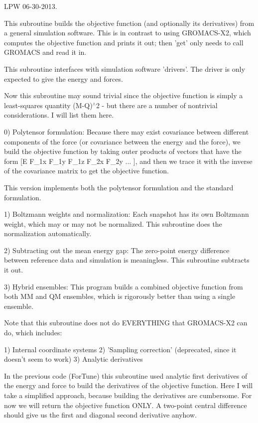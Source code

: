 L\-P\-W 06-\/30-\/2013. 

This subroutine builds the objective function (and optionally its derivatives) from a general simulation software. This is in contrast to using G\-R\-O\-M\-A\-C\-S-\/\-X2, which computes the objective function and prints it out; then 'get' only needs to call G\-R\-O\-M\-A\-C\-S and read it in.

This subroutine interfaces with simulation software 'drivers'. The driver is only expected to give the energy and forces.

Now this subroutine may sound trivial since the objective function is simply a least-\/squares quantity (M-\/\-Q)$^\wedge$2 -\/ but there are a number of nontrivial considerations. I will list them here.

0) Polytensor formulation\-: Because there may exist covariance between different components of the force (or covariance between the energy and the force), we build the objective function by taking outer products of vectors that have the form \mbox{[}E F\-\_\-1x F\-\_\-1y F\-\_\-1z F\-\_\-2x F\-\_\-2y ... \mbox{]}, and then we trace it with the inverse of the covariance matrix to get the objective function.

This version implements both the polytensor formulation and the standard formulation.

1) Boltzmann weights and normalization\-: Each snapshot has its own Boltzmann weight, which may or may not be normalized. This subroutine does the normalization automatically.

2) Subtracting out the mean energy gap\-: The zero-\/point energy difference between reference data and simulation is meaningless. This subroutine subtracts it out.

3) Hybrid ensembles\-: This program builds a combined objective function from both M\-M and Q\-M ensembles, which is rigorously better than using a single ensemble.

Note that this subroutine does not do E\-V\-E\-R\-Y\-T\-H\-I\-N\-G that G\-R\-O\-M\-A\-C\-S-\/\-X2 can do, which includes\-:

1) Internal coordinate systems 2) 'Sampling correction' (deprecated, since it doesn't seem to work) 3) Analytic derivatives

In the previous code (For\-Tune) this subroutine used analytic first derivatives of the energy and force to build the derivatives of the objective function. Here I will take a simplified approach, because building the derivatives are cumbersome. For now we will return the objective function O\-N\-L\-Y. A two-\/point central difference should give us the first and diagonal second derivative anyhow.

